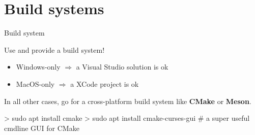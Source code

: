 \documentclass[compress]{beamer}
\begin{document}
%
%
%
%



\section{Build systems}

\begin{frame}[fragile, label=cmake]{Build system}

    Use and provide a build system!

    \begin{itemize}
        \item Windows-only $\Rightarrow$ a Visual Studio solution is ok
        \item MacOS-only $\Rightarrow$ a XCode project is ok
    \end{itemize}

    In all other cases, go for a cross-platform build system like {\bf
    CMake} or {\bf Meson}.

\begin{shcode}
> sudo apt install cmake
> sudo apt install cmake-curses-gui # a super useful cmdline GUI for CMake
\end{shcode}


\end{frame}
\end{document}
